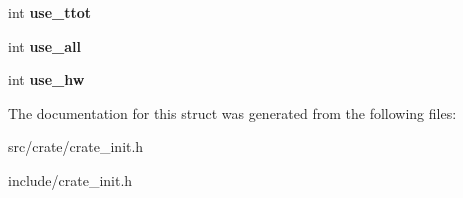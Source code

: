\begin{DoxyCompactItemize}
\item 
\hypertarget{structcrate__init__t_a78e220dbf8f9e9226a5f0beb64230412}{
int {\bfseries use\_\-ttot}}
\label{structcrate__init__t_a78e220dbf8f9e9226a5f0beb64230412}

\item 
\hypertarget{structcrate__init__t_a5e783c56613c40a12dbf760c9f6eb535}{
int {\bfseries use\_\-all}}
\label{structcrate__init__t_a5e783c56613c40a12dbf760c9f6eb535}

\item 
\hypertarget{structcrate__init__t_adf908ac1f51839545f2aeac21a347a1f}{
int {\bfseries use\_\-hw}}
\label{structcrate__init__t_adf908ac1f51839545f2aeac21a347a1f}

\end{DoxyCompactItemize}


The documentation for this struct was generated from the following files:\begin{DoxyCompactItemize}
\item 
src/crate/crate\_\-init.h\item 
include/crate\_\-init.h\end{DoxyCompactItemize}
